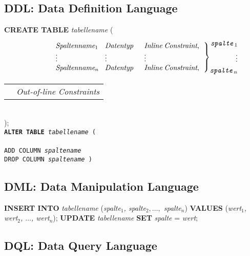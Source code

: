 \documentclass{article}
\begin{document}
		\subsection*{DDL: Data Definition Language}
			\textbf{CREATE TABLE } \textit{tabellename} ( \\
			\begin{align*}
				\begin{rcases*}
					\begin{tabular}{p{1cm}p{2cm}p{1.5cm}p{2.7cm}}
						& \textit{Spaltenname$_1$} & \textit{Datentyp} & \textit{Inline Constraint},\\
						& $\vdots$ & $\vdots$ & $\vdots$ \\
						& \textit{Spaltenname$_n$} & \textit{Datentyp} & \textit{Inline Constraint},\\
					\end{tabular}\\
				\end{rcases*} & \begin{aligned}\texttt{\textit{spalte}$_1$}\\\vdots\\\texttt{\textit{spalte}$_n$}\end{aligned}\\
			\end{align*}
			\begin{tabular}{p{1cm}p{4cm}}
			& \textit{Out-of-line Constraints}
			\end{tabular}\\
			);\\
			\texttt{\textbf{ALTER TABLE } \textit{tabellename} (\\\\
			\qquad ADD COLUMN \textit{spaltename}\\
			DROP COLUMN \textit{spaltename}
			)}\\
		\subsection*{DML: Data Manipulation Language}
			\textbf{INSERT INTO} \textit{tabellename} (\textit{spalte$_1$, spalte$_2, \ldots,$ spalte$_n$}) \textbf{VALUES} (\textit{wert$_1$, wert$_2$, $\ldots$, wert$_n$});
			\textbf{UPDATE } \textit{tabellename} \textbf{ SET } \textit{spalte} = \textit{wert};\\
		\subsection*{DQL: Data Query Language}
\end{document}
